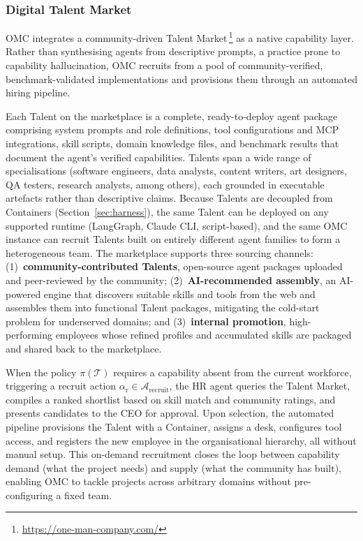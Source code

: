 \documentclass[11pt,a4paper]{article}
\begin{document}
\subsubsection{Digital Talent Market}
\label{sec:talent-market}

OMC integrates a community-driven Talent Market\,\footnote{\url{https://one-man-company.com/}} as a native capability layer.  Rather than synthesising agents from descriptive prompts, a practice prone to capability hallucination, OMC recruits from a pool of community-verified, benchmark-validated implementations and provisions them through an automated hiring pipeline.

Each Talent on the marketplace is a complete, ready-to-deploy agent package comprising system prompts and role definitions, tool configurations and MCP integrations, skill scripts, domain knowledge files, and benchmark results that document the agent's verified capabilities.  Talents span a wide range of specialisations (software engineers, data analysts, content writers, art designers, QA testers, research analysts, among others), each grounded in executable artefacts rather than descriptive claims.  Because Talents are decoupled from Containers (Section~\ref{sec:harness}), the same Talent can be deployed on any supported runtime (LangGraph, Claude CLI, script-based), and the same OMC instance can recruit Talents built on entirely different agent families to form a heterogeneous team.  The marketplace supports three sourcing channels: (1)~\textbf{community-contributed Talents}, open-source agent packages uploaded and peer-reviewed by the community; (2)~\textbf{AI-recommended assembly}, an AI-powered engine that discovers suitable skills and tools from the web and assembles them into functional Talent packages, mitigating the cold-start problem for underserved domains; and (3)~\textbf{internal promotion}, high-performing employees whose refined profiles and accumulated skills are packaged and shared back to the marketplace.

When the policy $\pi(\mathcal{T})$ requires a capability absent from the current workforce, triggering a recruit action $\alpha_{\text{r}} \in \mathcal{A}_{\text{recruit}}$, the HR agent queries the Talent Market, compiles a ranked shortlist based on skill match and community ratings, and presents candidates to the CEO for approval.  Upon selection, the automated pipeline provisions the Talent with a Container, assigns a desk, configures tool access, and registers the new employee in the organisational hierarchy, all without manual setup.  This on-demand recruitment closes the loop between capability demand (what the project needs) and supply (what the community has built), enabling OMC to tackle projects across arbitrary domains without pre-configuring a fixed team.
\end{document}
